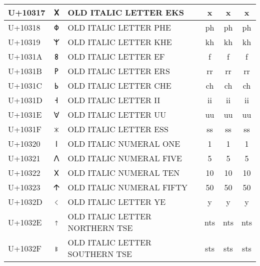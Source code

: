 {\begin{longtable}[l]{lclccc}
U+10317&\ftoitfont 𐌗&OLD ITALIC LETTER EKS&x&x&x \\ \hline
U+10318&\ftoitfont 𐌘&OLD ITALIC LETTER PHE&ph&ph&ph \\ \hline
U+10319&\ftoitfont 𐌙&OLD ITALIC LETTER KHE&kh&kh&kh \\ \hline
U+1031A&\ftoitfont 𐌚&OLD ITALIC LETTER EF&f&f&f \\ \hline
U+1031B&\ftoitfont 𐌛&OLD ITALIC LETTER ERS&rr&rr&rr \\ \hline
U+1031C&\ftoitfont 𐌜&OLD ITALIC LETTER CHE&ch&ch&ch \\ \hline
U+1031D&\ftoitfont 𐌝&OLD ITALIC LETTER II&ii&ii&ii \\ \hline
U+1031E&\ftoitfont 𐌞&OLD ITALIC LETTER UU&uu&uu&uu \\ \hline
U+1031F&\ftoitfont 𐌟&OLD ITALIC LETTER ESS&ss&ss&ss \\ \hline
U+10320&\ftoitfont 𐌠&OLD ITALIC NUMERAL ONE&1&1&1 \\ \hline
U+10321&\ftoitfont 𐌡&OLD ITALIC NUMERAL FIVE&5&5&5 \\ \hline
U+10322&\ftoitfont 𐌢&OLD ITALIC NUMERAL TEN&10&10&10 \\ \hline
U+10323&\ftoitfont 𐌣&OLD ITALIC NUMERAL FIFTY&50&50&50 \\ \hline
U+1032D&\ftoitfont 𐌭&OLD ITALIC LETTER YE&y&y&y \\ \hline
U+1032E&\ftoitfont 𐌮&OLD ITALIC LETTER NORTHERN TSE&nts&nts&nts \\ \hline
U+1032F&\ftoitfont 𐌯&OLD ITALIC LETTER SOUTHERN TSE&sts&sts&sts \\ \hline
\hline\end{longtable}
}
\newcommand\oitshowshort{%
\section{Short Commmands \oittagb }
\subsection{Trans}
\bqq{\cdr{\oittrans[uc]{U+10319}}}
\bqq{\cdr{\oittrans[un]{kh}}}
\bqq{\cdr{\oittrans[ts]{kh}} (default)} 
\bqq{\cdr{\oittrans[st]{kh}}}
\subsection{Text}
\bqq{\cdr{\oittext[w]{moku}} (default)} 
\bqq{\cdr{\oittext[ruby]{moku}}}
}